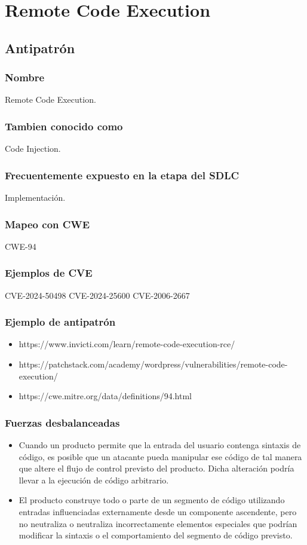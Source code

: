 \chapter{Remote Code Execution}
\section{Antipatrón}
\subsection*{Nombre}
Remote Code Execution.
\subsection*{Tambien conocido como}
Code Injection. 
\subsection*{Frecuentemente expuesto en la etapa del SDLC}
Implementación.
\subsection*{Mapeo con CWE}
CWE-94
\subsection*{Ejemplos de CVE}
CVE-2024-50498
CVE-2024-25600
CVE-2006-2667
\subsection*{Ejemplo de antipatrón}
\begin{itemize}
    \item https://www.invicti.com/learn/remote-code-execution-rce/
    \item https://patchstack.com/academy/wordpress/vulnerabilities/remote-code-execution/
    \item https://cwe.mitre.org/data/definitions/94.html
\end{itemize}
\subsection*{Fuerzas desbalanceadas}
\begin{itemize}
    \item Cuando un producto permite que la entrada del usuario contenga sintaxis de código, es posible que un atacante pueda manipular ese código de tal manera que altere el flujo de control previsto del producto. Dicha alteración podría llevar a la ejecución de código arbitrario.
    \item El producto construye todo o parte de un segmento de código utilizando entradas influenciadas externamente desde un componente ascendente, pero no neutraliza o neutraliza incorrectamente elementos especiales que podrían modificar la sintaxis o el comportamiento del segmento de código previsto.
\end{itemize}

